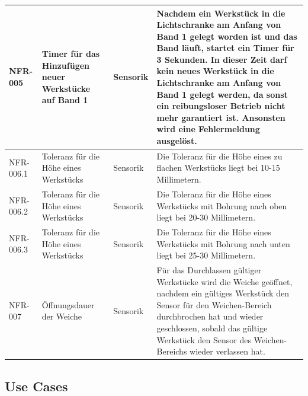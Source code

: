 \documentclass[oneside,a4paper,titlepage]{scrartcl} %
\begin{document}
\begin{small}
\begin{longtable}{|p{2cm}|p{4cm}|p{1.5cm}|p{5.5cm}|}
  \hline
  NFR-005 & Timer für das Hinzufügen neuer Werkstücke auf Band 1 & Sensorik & Nachdem ein Werkstück in die Lichtschranke am Anfang von Band 1 gelegt worden ist und das Band läuft, startet ein Timer für 3 Sekunden. In dieser Zeit darf kein neues Werkstück in die Lichtschranke am Anfang von Band 1 gelegt werden, da sonst ein reibungsloser Betrieb nicht mehr garantiert ist. Ansonsten wird eine Fehlermeldung ausgelöst.\\
  \hline
  \rowcolor{lightgray} NFR-006.1 & Toleranz für die Höhe eines Werkstücks & Sensorik & Die Toleranz für die Höhe eines zu flachen Werkstücks liegt bei 10-15 Millimetern.\\
  \hline
  \rowcolor{lightgray} NFR-006.2 & Toleranz für die Höhe eines Werkstücks & Sensorik & Die Toleranz für die Höhe eines Werkstücks mit Bohrung nach oben liegt bei 20-30 Millimetern.\\
  \hline
  \rowcolor{lightgray} NFR-006.3 & Toleranz für die Höhe eines Werkstücks & Sensorik & Die Toleranz für die Höhe eines Werkstücks mit Bohrung nach unten liegt bei 25-30 Millimetern.\\
  \hline
  NFR-007 & Öffnungsdauer der Weiche & Sensorik & Für das Durchlassen gültiger Werkstücke wird die Weiche geöffnet, nachdem ein gültiges Werkstück den Sensor
  für den Weichen-Bereich durchbrochen hat und wieder geschlossen, sobald das
  gültige Werkstück den Sensor des Weichen-Bereichs wieder verlassen hat.\\
  \hline
 \end{longtable}
\end{small}

\newpage

\subsection{Use Cases}
\end{document}
